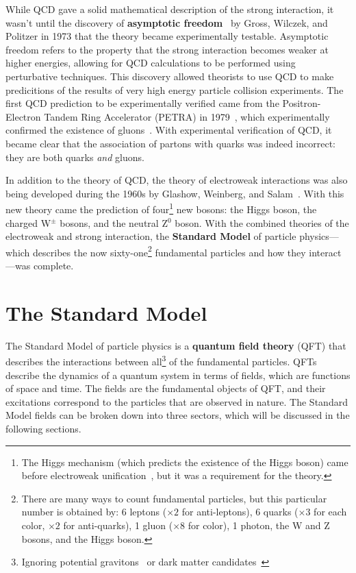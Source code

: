 While QCD gave a solid mathematical description of the strong interaction, it wasn't until the discovery of \textbf{asymptotic freedom}~\cite{AssFreedom1, AssFreedom2} by Gross, Wilczek, and Politzer in 1973 that the theory became experimentally testable. Asymptotic freedom refers to the property that the strong interaction becomes weaker at higher energies, allowing for QCD calculations to be performed using perturbative techniques. This discovery allowed theorists to use QCD to make predicitions of the results of very high energy particle collision experiments. The first QCD prediction to be experimentally verified came from the Positron-Electron Tandem Ring Accelerator (PETRA) in 1979~\cite{PETRA}, which experimentally confirmed the existence of gluons~\cite{GluonConfirmation}. With experimental verification of QCD, it became clear that the association of partons with quarks was indeed incorrect: they are both quarks \textit{and} gluons.

In addition to the theory of QCD, the theory of electroweak interactions was also being developed during the 1960s by Glashow, Weinberg, and Salam~\cite{Electroweak1, Electroweak2}. With this new theory came the prediction of four\footnote{The Higgs mechanism (which predicts the existence of the Higgs boson) came before electroweak unification~\cite{HiggsPaper}, but it was a requirement for the theory.} new bosons: the Higgs boson, the charged W$^{\pm}$ bosons, and the neutral Z$^{0}$ boson. With the combined theories of the electroweak and strong interaction, the \textbf{Standard Model} of particle physics---which describes the now sixty-one\footnote{There are many ways to count fundamental particles, but this particular number is obtained by: 6 leptons ($\times 2$ for anti-leptons), 6 quarks ($\times 3$ for each color, $\times 2$ for anti-quarks), 1 gluon ($\times 8$ for color), 1 photon, the W and Z bosons, and the Higgs boson.} fundamental particles and how they interact---was complete. 

\clearpage

\section{The Standard Model}
\label{sec:standard_model}

The Standard Model of particle physics is a \textbf{quantum field theory} (QFT) that describes the interactions between all\footnote{Ignoring potential gravitons~\cite{Graviton} or dark matter candidates~\cite{DarkMatter1}} of the fundamental particles. QFTs describe the dynamics of a quantum system in terms of fields, which are functions of space and time. The fields are the fundamental objects of QFT, and their excitations correspond to the particles that are observed in nature. The Standard Model fields can be broken down into three sectors, which will be discussed in the following sections.


